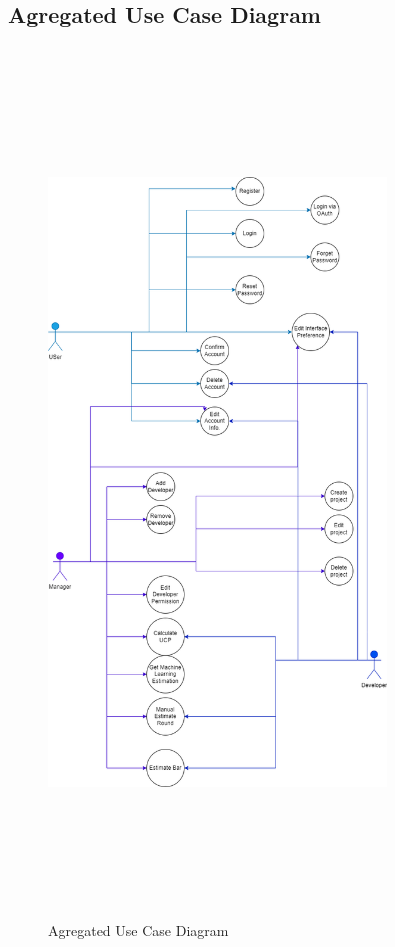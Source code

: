 \subsection{Agregated Use Case Diagram}
\begin{figure}[H]
    \includegraphics[height=23cm, width=0.8\textwidth]{./diagrams/Use Case/agrregated new.png}
    \centering 
    \caption{Agregated Use Case Diagram}
    \label{figurea}
    \end{figure}
    